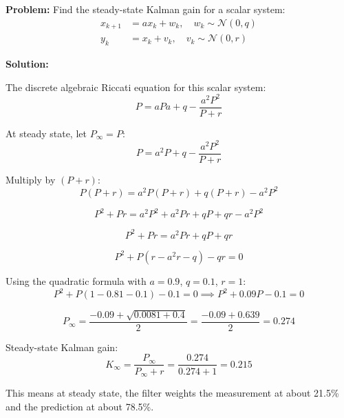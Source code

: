 \begin{examplebox}

\textbf{Problem:} Find the steady-state Kalman gain for a scalar system:
\begin{align}
x_{k+1} &= ax_k + w_k, \quad w_k \sim \mathcal{N}(0, q) \\
y_k &= x_k + v_k, \quad v_k \sim \mathcal{N}(0, r)
\end{align}

\textbf{Solution:}

The discrete algebraic Riccati equation for this scalar system:
\begin{equation}
P = aP a + q - \frac{a^2 P^2}{P + r}
\end{equation}

At steady state, let $P_\infty = P$:
\begin{equation}
P = a^2 P + q - \frac{a^2 P^2}{P + r}
\end{equation}

Multiply by $(P + r)$:
\begin{equation}
P(P + r) = a^2 P(P + r) + q(P + r) - a^2 P^2
\end{equation}

\begin{equation}
P^2 + Pr = a^2 P^2 + a^2 Pr + qP + qr - a^2 P^2
\end{equation}

\begin{equation}
P^2 + Pr = a^2 Pr + qP + qr
\end{equation}

\begin{equation}
P^2 + P(r - a^2 r - q) - qr = 0
\end{equation}

Using the quadratic formula with $a = 0.9$, $q = 0.1$, $r = 1$:
\begin{equation}
P^2 + P(1 - 0.81 - 0.1) - 0.1 = 0 \implies P^2 + 0.09P - 0.1 = 0
\end{equation}

\begin{equation}
P_\infty = \frac{-0.09 + \sqrt{0.0081 + 0.4}}{2} = \frac{-0.09 + 0.639}{2} = 0.274
\end{equation}

Steady-state Kalman gain:
\begin{equation}
K_\infty = \frac{P_\infty}{P_\infty + r} = \frac{0.274}{0.274 + 1} = 0.215
\end{equation}

This means at steady state, the filter weights the measurement at about 21.5\% and the prediction at about 78.5\%.
\end{examplebox}


